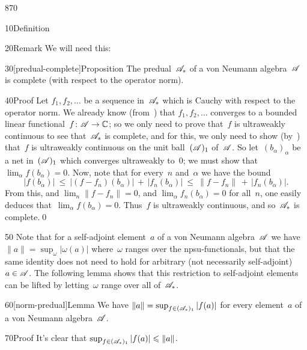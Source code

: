 \begin{parsec}{870}
\begin{point}{10}{Definition}
\begin{point}{20}{Remark}
We will need this:
\end{point}
\end{point}
\begin{point}{30}[predual-complete]{Proposition}%
The predual~$\mathscr{A}_*$ of a von Neumann algebra~$\mathscr{A}$
is complete (with respect to the operator norm).
\begin{point}{40}{Proof}%
Let $f_1,f_2,\dotsc$ be a sequence in~$\mathscr{A}_*$
which is Cauchy with respect to the operator norm.
We already know (from~)
that $f_1,f_2,\dotsc$ converges to a bounded linear 
functional~$f\colon \mathscr{A}\to\mathbb{C}$;
so we only need to prove that~$f$ is ultraweakly continuous
to see that~$\mathscr{A}_*$ is complete,
and for this,
we only need to show 
(by~)
that~$f$
is ultraweakly continuous
on the unit ball~$(\mathscr{A})_1$ of~$\mathscr{A}$.
So let~$(b_\alpha)_\alpha$ be 
a net in~$(\mathscr{A})_1$
which converges ultraweakly to~$0$;
we must show that~$\lim_\alpha f(b_\alpha)=0$.
Now, note that for every~$n$ and~$\alpha$
we have the bound
\begin{equation*}
	\left|f(b_\alpha)\right|
	\ \leq\ \left|(f-f_n)(b_\alpha)\right|
	\,+\,\left|f_n(b_\alpha)\right|
	\ \leq\ 
	\|f-f_n\|\,+\,\left|f_n(b_\alpha)\right|.
\end{equation*}
From this,
and $\lim_n\|f-f_n\|=0$,
and $\lim_\alpha f_n(b_\alpha)=0$
for all~$n$,
one easily deduces that~$\lim_\alpha f(b_\alpha)=0$.
Thus~$f$ is ultraweakly continuous,
and so~$\mathscr{A}_*$ is complete.\qed
\end{point}
\end{point}
\begin{point}{50}%
Note
that for a self-adjoint
element~$a$ of a von Neumann algebra~$\mathscr{A}$
we have $\|a\|=\sup_\omega \left|\omega(a)\right|$
where~$\omega$ ranges
over the npsu-functionals,
but that the same identity does not need to hold
for arbitrary (not necessarily self-adjoint) $a\in \mathscr{A}$.
The following lemma shows
that this restriction to self-adjoint elements
can be lifted 
by letting~$\omega$
range over all of~$\mathscr{A}_*$.
\end{point}
\begin{point}{60}[norm-predual]{Lemma}%
We have $\|a\|=\sup_{f\in(\mathscr{A}_*)_1}\left|f(a)\right|$
for every element~$a$ of a von Neumann algebra~$\mathscr{A}$.
\begin{point}{70}{Proof}%
It's clear that $\sup_{f\in(\mathscr{A}_*)_1}\left|f(a)\right|\leqslant \|a\|$.


\end{point}
\end{point}
\end{parsec}
